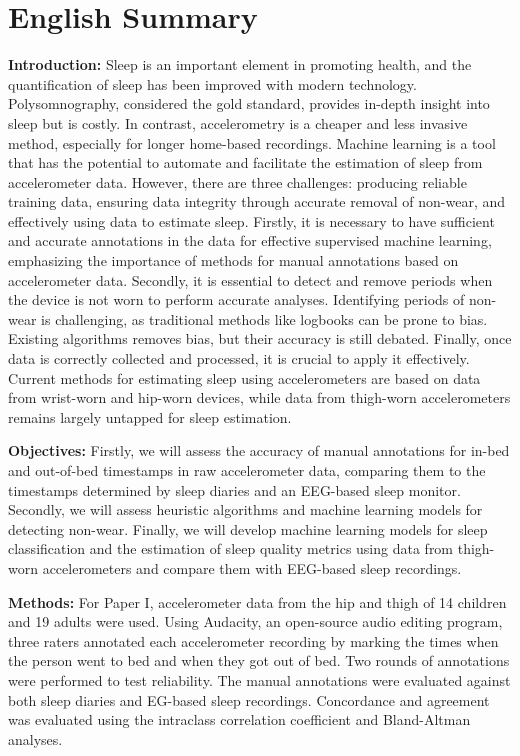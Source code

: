 \documentclass[
  10pt,
]{scrbook}
\let\originaltextbf\textbf
\renewcommand{\textbf}[1]{\textcolor{color1}{\textsf{\originaltextbf{#1}}}}
\begin{document}
\hypertarget{english-summary}{%
\chapter{English Summary}\label{english-summary}}

\textbf{Introduction:} Sleep is an important element in promoting
health, and the quantification of sleep has been improved with modern
technology. Polysomnography, considered the gold standard, provides
in-depth insight into sleep but is costly. In contrast, accelerometry is
a cheaper and less invasive method, especially for longer home-based
recordings. Machine learning is a tool that has the potential to
automate and facilitate the estimation of sleep from accelerometer data.
However, there are three challenges: producing reliable training data,
ensuring data integrity through accurate removal of non-wear, and
effectively using data to estimate sleep. Firstly, it is necessary to
have sufficient and accurate annotations in the data for effective
supervised machine learning, emphasizing the importance of methods for
manual annotations based on accelerometer data. Secondly, it is
essential to detect and remove periods when the device is not worn to
perform accurate analyses. Identifying periods of non-wear is
challenging, as traditional methods like logbooks can be prone to bias.
Existing algorithms removes bias, but their accuracy is still debated.
Finally, once data is correctly collected and processed, it is crucial
to apply it effectively. Current methods for estimating sleep using
accelerometers are based on data from wrist-worn and hip-worn devices,
while data from thigh-worn accelerometers remains largely untapped for
sleep estimation.

\textbf{Objectives:} Firstly, we will assess the accuracy of manual
annotations for in-bed and out-of-bed timestamps in raw accelerometer
data, comparing them to the timestamps determined by sleep diaries and
an EEG-based sleep monitor. Secondly, we will assess heuristic
algorithms and machine learning models for detecting non-wear. Finally,
we will develop machine learning models for sleep classification and the
estimation of sleep quality metrics using data from thigh-worn
accelerometers and compare them with EEG-based sleep recordings.

\textbf{Methods:} For Paper I, accelerometer data from the hip and thigh
of 14 children and 19 adults were used. Using Audacity, an open-source
audio editing program, three raters annotated each accelerometer
recording by marking the times when the person went to bed and when they
got out of bed. Two rounds of annotations were performed to test
reliability. The manual annotations were evaluated against both sleep
diaries and EG-based sleep recordings. Concordance and agreement was
evaluated using the intraclass correlation coefficient and Bland-Altman
analyses.
\end{document}
